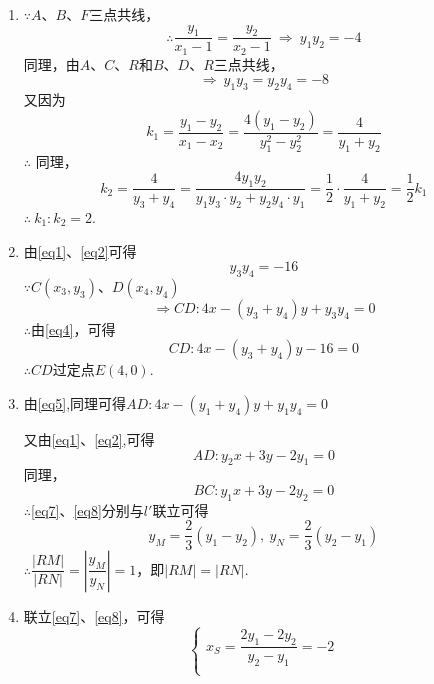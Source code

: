 \documentclass[UTF8, 12pt, a4paper]{ctexart}
\begin{document}
\begin{enumerate}
\item \label{q1}$\because A$、$B$、$F$三点共线，
\begin{equation}
    \therefore \dfrac{y_1}{x_1-1}=\dfrac{y_2}{x_2-1}\ \Rightarrow \ y_1y_2=-4\label{eq1}
\end{equation}
同理，由$A$、$C$、$R$和$B$、$D$、$R$三点共线，
\begin{equation}
    \Rightarrow\ y_1y_3=y_2y_4=-8\label{eq2}
\end{equation}
又因为
\begin{equation}
k_1=\dfrac{y_1-y_2}{x_1-x_2}=\dfrac{4\left(y_1-y_2 \right)}{y_1^2-y_2^2}=\dfrac{4}{y_1+y_2}\label{eq3}
\end{equation}
$\therefore$ 同理，
\[k_2=\dfrac{4}{y_3+y_4}=\dfrac{4y_1y_2}{y_1y_3\cdot y_2+y_2y_4\cdot y_1}=\dfrac{1}{2}\cdot\dfrac{4}{y_1+y_2}=\dfrac{1}{2}k_1\]
$\therefore\ k_1:k_2=2$.
\item \label{q2}由\eqref{eq1}、\eqref{eq2}可得
\begin{equation}
y_3y_4=-16\label{eq4}
\end{equation}
$\because C\left(x_3,y_3 \right)$、$D\left(x_4,y_4 \right)$
\begin{equation}
\Rightarrow CD:4x-\left(y_3+y_4 \right)y+y_3y_4=0\label{eq5}
\end{equation}
$\therefore$由\eqref{eq4}，可得
\begin{equation}
CD:4x-\left(y_3+y_4 \right)y-16=0\label{eq6}
\end{equation}
$\therefore CD$过定点$E\left(4,0 \right)$.
\item \label{q3}由\eqref{eq5},同理可得$AD:4x-\left(y_1+y_4 \right)y+y_1y_4=0$\par
又由\eqref{eq1}、\eqref{eq2},可得
\begin{equation}
AD:y_2x+3y-2y_1=0\label{eq7}
\end{equation}
同理，
\begin{equation}
BC:y_1x+3y-2y_2=0\label{eq8}
\end{equation}
$\therefore$\eqref{eq7}、\eqref{eq8}分别与$l'$联立可得
\[y_M=\dfrac{2}{3}(y_1-y_2),\ y_N=\dfrac{2}{3}(y_2-y_1)\]
$\therefore\dfrac{\left|RM\right|}{\left|RN\right|}=\left|\dfrac{y_M}{y_N}\right|=1$，即$\left|RM \right|=\left|RN \right|$.
\item \label{q4}联立\eqref{eq7}、\eqref{eq8}，可得
\begin{equation}
    \begin{cases}
    x_S=\dfrac{2y_1-2y_2}{y_2-y_1}=-2\\[2mm]

\end{cases}
\end{equation}
\end{enumerate}
\end{document}
